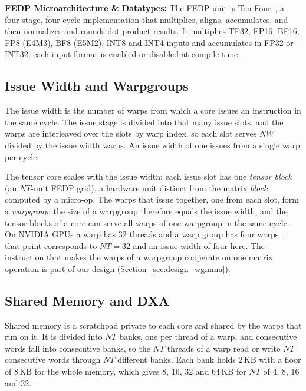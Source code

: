 \textbf{FEDP Microarchitecture \& Datatypes:}\label{para:datatypes-fedp} The FEDP unit is Ten-Four~\cite{rout2026tenfouropensourcefuseddot}, a four-stage, four-cycle implementation that multiplies, aligns, accumulates, and then normalizes and rounds dot-product results. It multiplies TF32, FP16, BF16, FP8 (E4M3), BF8 (E5M2), INT8 and INT4 inputs and accumulates in FP32 or INT32; each input format is enabled or disabled at compile time.

\subsection{Issue Width and Warpgroups}
\label{sec:bg_issue}

The issue width is the number of warps from which a core issues an instruction in the same cycle. The issue stage is divided into that many issue slots, and the warps are interleaved over the slots by warp index, so each slot serves $\mathit{NW}$ divided by the issue width warps. An issue width of one issues from a single warp per cycle.


The tensor core scales with the issue width: each issue slot has one \emph{tensor block} (an $\mathit{NT}$-unit FEDP grid), a hardware unit distinct from the matrix \emph{block} computed by a micro-op.
 The warps that issue together, one from each slot, form a \emph{warpgroup}; the size of a warpgroup therefore equals the issue width, and the tensor blocks of a core can serve all warps of one warpgroup in the same cycle. On NVIDIA GPUs a warp has 32 threads and a warp group has four warps~\cite{luo2025dissectingnvidiahopperarchitecture}; that point corresponds to $\mathit{NT}{=}32$ and an issue width of four here. The instruction that makes the warps of a warpgroup cooperate on one matrix operation is part of our design (Section~\ref{sec:design_wgmma}).

\subsection{Shared Memory and DXA}
\label{sec:bg_smem}

Shared memory is a scratchpad private to each core and shared by the warps that run on it. It is divided into $\mathit{NT}$ banks, one per thread of a warp, and consecutive words fall into consecutive banks, so the $\mathit{NT}$ threads of a warp read or write $\mathit{NT}$ consecutive words through $\mathit{NT}$ different banks. Each bank holds 2\,KB with a floor of 8\,KB for the whole memory, which gives 8, 16, 32 and 64\,KB for $\mathit{NT}$ of 4, 8, 16 and 32.

